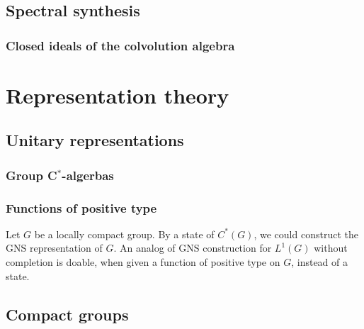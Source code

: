\documentclass{../note}
\begin{document}
\chapter{Spectral synthesis}
\section{Closed ideals of the colvolution algebra}








\part{Representation theory}
\chapter{Unitary representations}
\section{}
\begin{prb}
\end{prb}
\section{Group C$^*$-algerbas}
\begin{prb}
\end{prb}
\section{Functions of positive type}
\begin{prb}
\end{prb}
\begin{prb}
\end{prb}
\begin{prb}
Let $G$ be a locally compact group.
By a state of $C^*(G)$, we could construct the GNS representation of $G$.
An analog of GNS construction for $L^1(G)$ without completion is doable, when given a function of positive type on $G$, instead of a state.
\end{prb}


\chapter{Compact groups}
\end{document}
